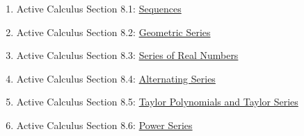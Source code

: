\begin{enumerate}
    \item Active Calculus Section 8.1:
        \href{http://faculty.gvsu.edu/boelkinm/Home/AC/sec-8-1-sequences.html}{Sequences}
    \item Active Calculus Section 8.2:
        \href{http://faculty.gvsu.edu/boelkinm/Home/AC/sec-8-2-geometric.html}{Geometric
        Series}
    \item Active Calculus Section 8.3:
        \href{http://faculty.gvsu.edu/boelkinm/Home/AC/sec-8-3-series.html}{Series of Real
        Numbers}
    \item Active Calculus Section 8.4:
        \href{http://faculty.gvsu.edu/boelkinm/Home/AC/sec-8-4-alternating.html}{Alternating
        Series}
    \item Active Calculus Section 8.5:
        \href{http://faculty.gvsu.edu/boelkinm/Home/AC/sec-8-5-taylor.html}{Taylor
        Polynomials and Taylor Series}
    \item Active Calculus Section 8.6:
        \href{http://faculty.gvsu.edu/boelkinm/Home/AC/sec-8-6-powerseries.html}{Power
        Series}
\end{enumerate}


